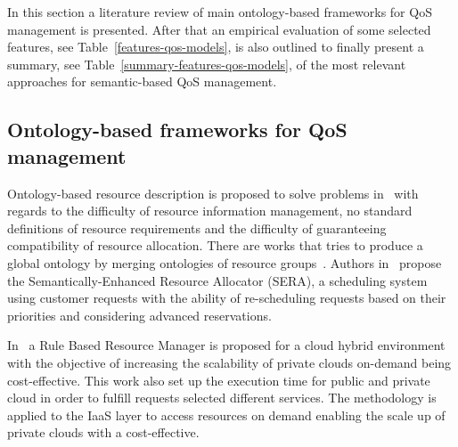 In this section a literature review of main ontology-based frameworks for QoS management is presented. After that 
an empirical evaluation of some selected features, see Table~\ref{features-qos-models}, is also outlined to finally present 
a summary, see Table~\ref{summary-features-qos-models}, of the most relevant approaches for semantic-based QoS management.
\subsection{Ontology-based frameworks for QoS management}
Ontology-based resource description is proposed to solve problems in~\cite{Pernas:2005:UOD:1068510.1069326,Armstrong17} with regards to the difficulty of 
resource information management, no standard definitions of resource requirements and the difficulty of guaranteeing compatibility of resource allocation. 
There are works that tries to produce a global ontology by merging ontologies of resource groups~\cite{Lopes:2006:PEM:1135771.1136110}. 
Authors in~\cite{Ejarque:2008:USR:1443230.1444322} propose the Semantically-Enhanced Resource Allocator (SERA), a scheduling system using customer 
requests with the ability of re-scheduling requests based on their priorities and considering advanced reservations.


In~\cite{rule-2013-resource-provisioning} a Rule Based Resource Manager is proposed for a cloud hybrid environment with the objective of increasing the scalability of private 
clouds on-demand being cost-effective. This work also set up the execution time for public and private cloud in order to fulfill requests selected different services. 
The methodology is applied to the IaaS layer to access resources on demand enabling the scale up of private clouds with a cost-effective.

